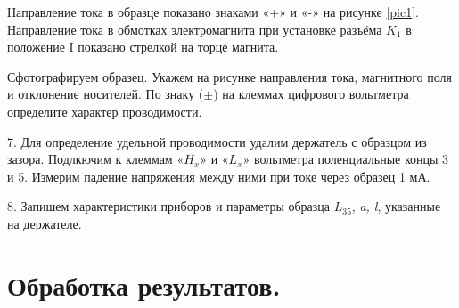 \documentclass[a4paper,12pt]{article} %
\begin{document}
Направление тока в образце показано знаками «+» и «-» на рисунке \eqref{pic1}. Направление тока в обмотках электромагнита при установке разъёма $K_1$ в положение I показано стрелкой на торце магнита.

Сфотографируем образец. Укажем на рисунке направления тока, магнитного поля и отклонение носителей. По знаку ($\pm$) на клеммах цифрового вольтметра определите характер проводимости.

7. Для определение удельной проводимости удалим держатель с образцом из зазора. Подлкючим к клеммам «$H_x$» и «$L_x$» вольтметра поленциальные концы 3 и 5. Измерим падение напряжения между ними при токе через образец 1 мА.

8. Запишем характеристики приборов и параметры образца $L_{35}$, \textit{a, l}, указанные на держателе.

\section{Обработка результатов.}
\end{document}
